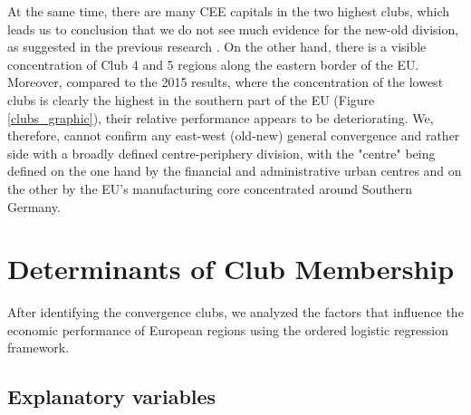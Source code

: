 \documentclass[11pt]{article}
\begin{document}
At the same time, there are many CEE capitals in the two highest clubs, which leads us to conclusion that we do not see much evidence for the new-old division, as suggested in the previous research \citep{eckey2007convergence}.
On the other hand, there is a visible concentration of Club 4 and 5 regions along the eastern border of the EU. Moreover, compared to the 2015 results, where the concentration of the lowest clubs is clearly the highest in the southern part of the EU (Figure \ref{clubs_graphic}), their relative performance appears to be deteriorating. We, therefore, cannot confirm any east-west (old-new) general convergence and rather side with a broadly defined centre-periphery division, with the "centre" being defined on the one hand by the financial and administrative urban centres and on the other by the EU's manufacturing core concentrated around Southern Germany.



\section{Determinants of Club Membership}
\label{Determinants of club membership}


 
After identifying the convergence clubs, we analyzed the factors that influence the economic performance of European regions using the ordered logistic regression framework.

\subsection{Explanatory variables}
\end{document}
